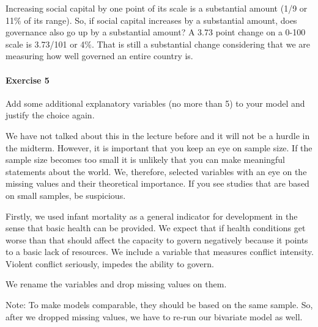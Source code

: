 \documentclass[]{article}
\newenvironment{Shaded}{\begin{snugshade}}{\end{snugshade}}
\newcommand{\KeywordTok}[1]{\textcolor[rgb]{0.13,0.29,0.53}{\textbf{#1}}}
\newcommand{\StringTok}[1]{\textcolor[rgb]{0.31,0.60,0.02}{#1}}
\newcommand{\CommentTok}[1]{\textcolor[rgb]{0.56,0.35,0.01}{\textit{#1}}}
\newcommand{\OperatorTok}[1]{\textcolor[rgb]{0.81,0.36,0.00}{\textbf{#1}}}
\newcommand{\NormalTok}[1]{#1}
\let\oldparagraph\paragraph
\renewcommand{\paragraph}[1]{\oldparagraph{#1}\mbox{}}
\theoremstyle{definition}
\theoremstyle{definition}
\theoremstyle{definition}
\theoremstyle{remark}
\begin{document}
Increasing social capital by one point of its scale is a substantial
amount (1/9 or 11\(\%\) of its range). So, if social capital increases
by a substantial amount, does governance also go up by a substantial
amount? A 3.73 point change on a 0-100 scale is 3.73/101 or 4\(\%\).
That is still a substantial change considering that we are measuring how
well governed an entire country is.

\paragraph{Exercise 5}\label{exercise-5-6}

Add some additional explanatory variables (no more than 5) to your model
and justify the choice again.

We have not talked about this in the lecture before and it will not be a
hurdle in the midterm. However, it is important that you keep an eye on
sample size. If the sample size becomes too small it is unlikely that
you can make meaningful statements about the world. We, therefore,
selected variables with an eye on the missing values and their
theoretical importance. If you see studies that are based on small
samples, be suspicious.

Firstly, we used infant mortality as a general indicator for development
in the sense that basic health can be provided. We expect that if health
conditions get worse than that should affect the capacity to govern
negatively because it points to a basic lack of resources. We include a
variable that measures conflict intensity. Violent conflict seriously,
impedes the ability to govern.

We rename the variables and drop missing values on them.

Note: To make models comparable, they should be based on the same
sample. So, after we dropped missing values, we have to re-run our
bivariate model as well.

\begin{Shaded}
\end{Shaded}
\end{document}
